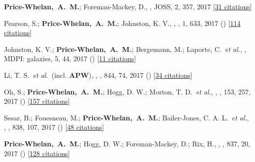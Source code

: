 \item[{\color{deemph}\scriptsize30}]\textbf{Price-Whelan,~A.~M.}; Foreman-Mackey, D., , JOSS, 2, 357, 2017 [\href{http://adsabs.harvard.edu/abs/2017JOSS....2..357P}{31 citations}]

\item[{\color{deemph}\scriptsize29}]Pearson, S.; \textbf{Price-Whelan,~A.~M.}; Johnston, K. V., , \natureast, 1, 633, 2017 () [\href{http://adsabs.harvard.edu/abs/2017NatAs...1..633P}{114 citations}]

\item[{\color{deemph}\scriptsize28}]Johnston, K. V.; \textbf{Price-Whelan,~A.~M.}; Bergemann, M.; Laporte, C.~\textit{et al.}, , MDPI: galaxies, 5, 44, 2017 () [\href{http://adsabs.harvard.edu/abs/2017Galax...5...44J}{11 citations}]

\item[{\color{deemph}\scriptsize27}]Li, T. S.~\textit{et al.}~(incl. \textbf{APW}), , \apj, 844, 74, 2017 () [\href{http://adsabs.harvard.edu/abs/2017ApJ...844...74L}{34 citations}]

\item[{\color{deemph}\scriptsize26}]Oh, S.; \textbf{Price-Whelan,~A.~M.}; Hogg, D. W.; Morton, T. D.~\textit{et al.}, , \aj, 153, 257, 2017 () [\href{http://adsabs.harvard.edu/abs/2017AJ....153..257O}{157 citations}]

\item[{\color{deemph}\scriptsize25}]Sesar, B.; Fouesneau, M.; \textbf{Price-Whelan,~A.~M.}; Bailer-Jones, C. A. L.~\textit{et al.}, , \apj, 838, 107, 2017 () [\href{http://adsabs.harvard.edu/abs/2017ApJ...838..107S}{48 citations}]

\item[{\color{deemph}\scriptsize24}]\textbf{Price-Whelan,~A.~M.}; Hogg, D. W.; Foreman-Mackey, D.; Rix, H., , \apj, 837, 20, 2017 () [\href{http://adsabs.harvard.edu/abs/2017ApJ...837...20P}{128 citations}]

